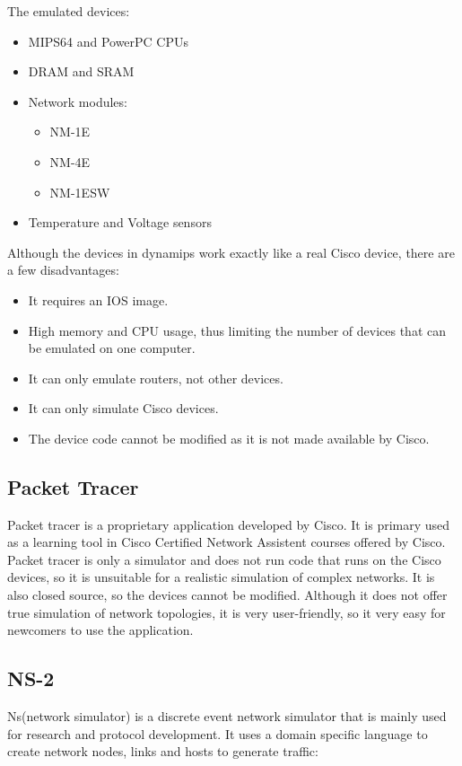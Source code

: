 The emulated devices:
\begin{itemize}
  \item MIPS64 and PowerPC CPUs
  \item DRAM and SRAM
  \item Network modules:
    \begin{itemize}
      \item NM-1E
      \item NM-4E
      \item NM-1ESW
    \end{itemize}
  \item Temperature and Voltage sensors
\end{itemize}

Although the devices in dynamips work exactly like a real Cisco device, there are a few disadvantages:
\begin{itemize}
  \item It requires an IOS image.
  \item High memory and CPU usage, thus limiting the number of devices that can be emulated on one computer.
  \item It can only emulate routers, not other devices.
  \item It can only simulate Cisco devices.
  \item The device code cannot be modified as it is not made available by Cisco.
\end{itemize}

\subsection{Packet Tracer}

Packet tracer is a proprietary application developed by Cisco. It is primary used as a learning tool
in Cisco Certified Network Assistent courses offered by Cisco.
Packet tracer is only a simulator and does not run code that runs on the Cisco devices, so
it is unsuitable for a realistic simulation of complex networks. It is also closed source, so
the devices cannot be modified. Although it does not offer true simulation of network topologies,
it is very user-friendly, so it very easy for newcomers to use the application.

\subsection{NS-2}
Ns(network simulator) is a discrete event network simulator that is mainly used for research and 
protocol development. It uses a domain specific language to create network nodes, links and
hosts to generate traffic:


